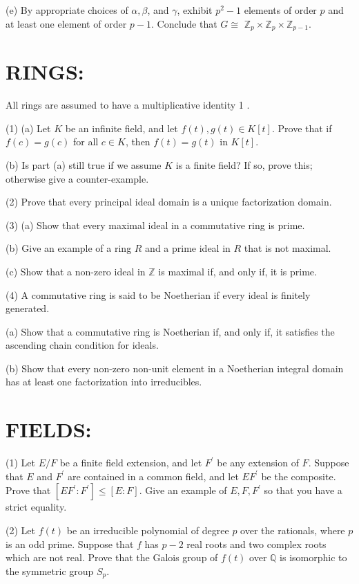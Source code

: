 \documentclass[10pt]{article}
\begin{document}
(e) By appropriate choices of $\alpha, \beta$, and $\gamma$, exhibit $p^{2}-1$ elements of order $p$ and at least one element of order $p-1$. Conclude that $G \cong$ $\mathbb{Z}_{p} \times \mathbb{Z}_{p} \times \mathbb{Z}_{p-1} .$

\section{RINGS:}
All rings are assumed to have a multiplicative identity 1 .

(1) (a) Let $K$ be an infinite field, and let $f(t), g(t) \in K[t]$. Prove that if $f(c)=g(c)$ for all $c \in K$, then $f(t)=g(t)$ in $K[t] .$

(b) Is part (a) still true if we assume $K$ is a finite field? If so, prove this; otherwise give a counter-example.

(2) Prove that every principal ideal domain is a unique factorization domain.

(3) (a) Show that every maximal ideal in a commutative ring is prime.

(b) Give an example of a ring $R$ and a prime ideal in $R$ that is not maximal.

(c) Show that a non-zero ideal in $\mathbb{Z}$ is maximal if, and only if, it is prime.

(4) A commutative ring is said to be Noetherian if every ideal is finitely generated.

(a) Show that a commutative ring is Noetherian if, and only if, it satisfies the ascending chain condition for ideals.

(b) Show that every non-zero non-unit element in a Noetherian integral domain has at least one factorization into irreducibles.

\section{FIELDS:}
(1) Let $E / F$ be a finite field extension, and let $F^{\prime}$ be any extension of $F$. Suppose that $E$ and $F^{\prime}$ are contained in a common field, and let $E F^{\prime}$ be the composite. Prove that $\left[E F^{\prime}: F^{\prime}\right] \leq[E: F]$. Give an example of $E, F, F^{\prime}$ so that you have a strict equality.

(2) Let $f(t)$ be an irreducible polynomial of degree $p$ over the rationals, where $p$ is an odd prime. Suppose that $f$ has $p-2$ real roots and two complex roots which are not real. Prove that the Galois group of $f(t)$ over $\mathbb{Q}$ is isomorphic to the symmetric group $S_{p}$.
\end{document}
